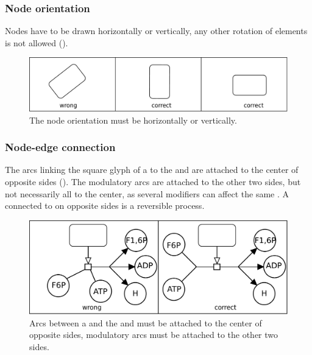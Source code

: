 \subsubsection{Node orientation}

Nodes have to be drawn horizontally or vertically, any other
rotation of elements is not allowed ().

\begin{figure}[h!]
  \centering
  \includegraphics[scale=0.3]{images/layout-orientation}
  \caption{The node orientation must be horizontally or
  vertically.}\label{fig:layout5}
\end{figure}

\subsubsection{Node-edge connection}

The arcs linking the square glyph of a  to the  and 
 are attached to the center of opposite sides (). The modulatory
arcs are attached to the other two sides, but not necessarily
all to the center, as several modifiers can affect the same . A  connected to  on opposite
sides is a reversible process.

\begin{figure}[h!]
  \centering
  \includegraphics[scale=0.3]{images/layout-connecting-arcs}
  \caption{Arcs between a   and the  and  must be attached to the center of opposite sides, modulatory
  arcs must be attached to the other two sides.}\label{fig:layout6}
\end{figure}

